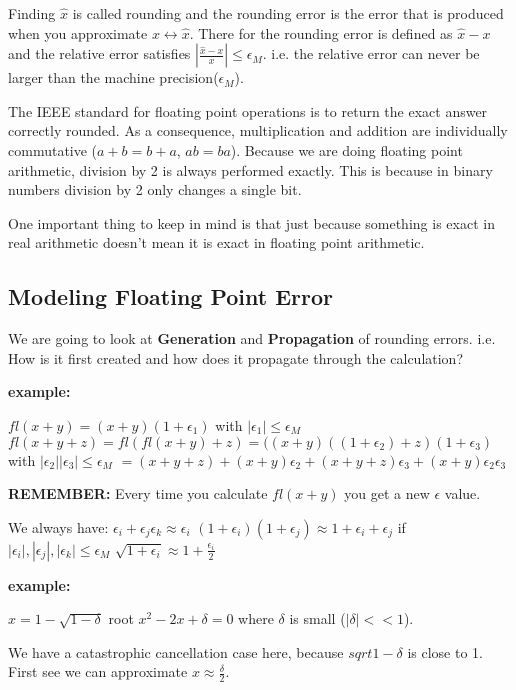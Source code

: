 \documentclass{article}
\newcommand{\n}{\newline}
\begin{document}
\begin{flushleft}
	Finding $\hat{x}$ is called rounding and the rounding error is the error that is produced when you approximate $x\leftrightarrow\hat{x}$.  There for the rounding error is defined as $\hat{x}-x$ and the relative error satisfies $|\frac{\hat{x}-x}{x}|\leq\epsilon_{M}$.  i.e. the relative error can never be larger than the machine precision($\epsilon_{M}$). \n
	
	The IEEE standard for floating point operations is to return the exact answer correctly rounded. As a consequence, multiplication and addition are individually commutative ($a+b=b+a$, $ab=ba$).  Because we are doing floating point arithmetic, division by 2 is always performed exactly.  This is because in binary numbers division by 2 only changes a single bit.  \n
	
	One important thing to keep in mind is that just because something is exact in real arithmetic doesn't mean it is exact in floating point arithmetic. \n
	
	\subsection{Modeling Floating Point Error}
	 
	 We are going to look at \textbf{Generation} and \textbf{Propagation} of rounding errors.  i.e. How is it first created and how does it propagate through the calculation?\n
	 
	 \textbf{example:}\n
	 
	 $fl(x+y)=(x+y)(1+\epsilon_{1})$ with $|\epsilon_{1}|\leq\epsilon_{M}$ \n
	 $fl(x+y+z)=fl(fl(x+y)+z) = ((x+y)((1+\epsilon_{2})+z)(1+\epsilon_{3})$ with $|\epsilon_{2}||\epsilon_{3}|\leq\epsilon_{M}$\n
	 $=(x+y+z)+(x+y)\epsilon_{2}+(x+y+z)\epsilon_{3}+(x+y)\epsilon_{2}\epsilon_{3}$\n
	 
	 \textbf{REMEMBER:} Every time you calculate $fl(x+y)$ you get a new $\epsilon$ value.\n
	 
	 We always have:\n
	 $\epsilon_{i}+\epsilon_{j}\epsilon_{k}\approx\epsilon_{i}$ \n
	 $(1+\epsilon_{i})(1+\epsilon_{j})\approx1+\epsilon_{i}+\epsilon_{j}$ if $|\epsilon_{i}|,|\epsilon_{j}|,|\epsilon_{k}|\leq\epsilon_{M}$ \n
	 $\sqrt{1+\epsilon_{i}}\approx1+\frac{\epsilon_i}{2}$\n
	 
	 \textbf{example: } \n
	 
	 $x=1-\sqrt{1-\delta}$ root $x^{2}-2x+\delta=0$ where $\delta$ is small ($|\delta|<<1$).\n
	 
	 We have a catastrophic cancellation case here, because $sqrt{1-\delta}$ is close to 1.  First see we can approximate $x\approx\frac{\delta}{2}$. 
	 
	 
	
	
	\end{flushleft}
	

	
	
	
	
	

	
\end{document}
